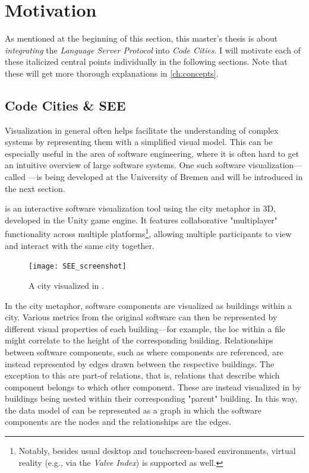 \documentclass[../thesis]{subfiles}
\begin{document}
\section{Motivation}
As mentioned at the beginning of this section, this master's thesis is about \emph{integrating} the \emph{Language Server Protocol} into \emph{Code Cities}.
I will motivate each of these italicized central points individually in the following sections.
Note that these will get more thorough explanations in \cref{ch:concepts}.

\subsection{Code Cities \& SEE}\label{subsec:see}
Visualization in general often helps facilitate the understanding of complex systems by representing them with a simplified visual model.
This can be especially useful in the area of software engineering, where it is often hard to get an intuitive overview of large software systems.
One such software visualization---called \SEE{}---is being developed at the University of Bremen and will be introduced in the next section.

\SEE{} is an interactive software visualization tool using the \gls*{city} metaphor in 3D, developed in the {Unity} game engine.
It features collaborative "multiplayer" functionality across multiple platforms\footnote{
	Notably, besides usual desktop and touchscreen-based environments, virtual reality (e.g., via the \emph{Valve Index}) is supported as well.
}, allowing multiple participants to view and interact with the same \gls*{city} together.

\begin{figure}[hbtp]
	\centering
	\texttt{[image: SEE\_screenshot]}
	\caption{A \gls{city} visualized in \SEE{}.}\label{fig:city}
\end{figure}

In the \gls{city} metaphor, software components are visualized as buildings within a city.
Various metrics from the original software can then be represented by different visual properties of each building---for example, the \gls{loc} within a file might correlate to the height of the corresponding building.
Relationships between software components, such as where components are referenced, are instead represented by edges drawn between the respective buildings.
The exception to this are part-of relations, that is, relations that describe which component belongs to which other component.
These are instead visualized in \SEE{} by buildings being nested within their corresponding "parent" building.
In this way, the data model of \SEE{} can be represented as a graph in which the software components are the nodes and the relationships are the edges.
\end{document}
